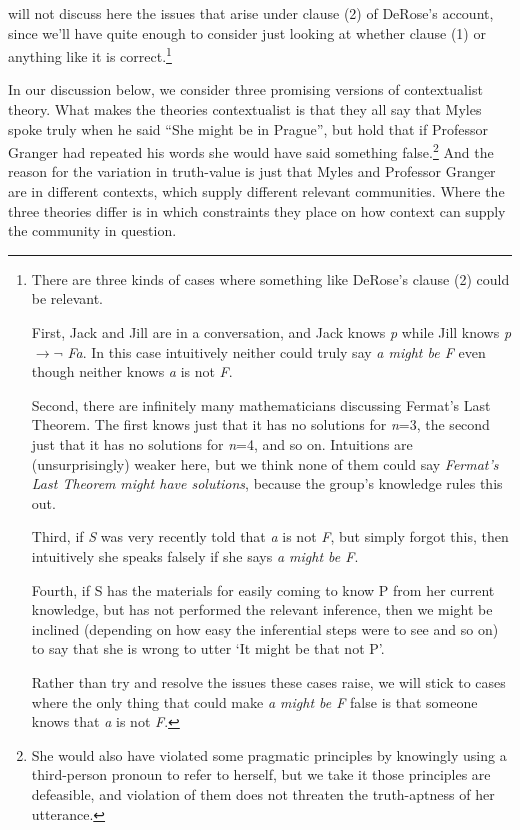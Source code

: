 \documentclass[
  11pt,
  letterpaper,
  DIV=11,
  numbers=noendperiod]{scrartcl}
\begin{document}
will not discuss here the issues that arise under clause (2) of DeRose's
account, since we'll have quite enough to consider just looking at
whether clause (1) or anything like it is correct.\footnote{There are
  three kinds of cases where something like DeRose's clause (2) could be
  relevant.

  First, Jack and Jill are in a conversation, and Jack knows \emph{p}
  while Jill knows \emph{p} \({\rightarrow \neg}\) \emph{Fa}. In this
  case intuitively neither could truly say \emph{a might be F} even
  though neither knows \emph{a} is not \emph{F}.

  Second, there are infinitely many mathematicians discussing Fermat's
  Last Theorem. The first knows just that it has no solutions for
  \emph{n}=3, the second just that it has no solutions for \emph{n}=4,
  and so on. Intuitions are (unsurprisingly) weaker here, but we think
  none of them could say \emph{Fermat's Last Theorem} \emph{might have
  solutions}, because the group's knowledge rules this out.

  Third, if \emph{S} was very recently told that \emph{a} is not
  \emph{F}, but simply forgot this, then intuitively she speaks falsely
  if she says \emph{a might be F}.

  Fourth, if S has the materials for easily coming to know P from her
  current knowledge, but has not performed the relevant inference, then
  we might be inclined (depending on how easy the inferential steps were
  to see and so on) to say that she is wrong to utter `It might be that
  not P'.

  Rather than try and resolve the issues these cases raise, we will
  stick to cases where the only thing that could make \emph{a might be
  F} false is that someone knows that \emph{a} is not \emph{F}.}

In our discussion below, we consider three promising versions of
contextualist theory. What makes the theories contextualist is that they
all say that Myles spoke truly when he said ``She might be in Prague'',
but hold that if Professor Granger had repeated his words she would have
said something false.\footnote{She would also have violated some
  pragmatic principles by knowingly using a third-person pronoun to
  refer to herself, but we take it those principles are defeasible, and
  violation of them does not threaten the truth-aptness of her
  utterance.} And the reason for the variation in truth-value is just
that Myles and Professor Granger are in different contexts, which supply
different relevant communities. Where the three theories differ is in
which constraints they place on how context can supply the community in
question.
\end{document}
